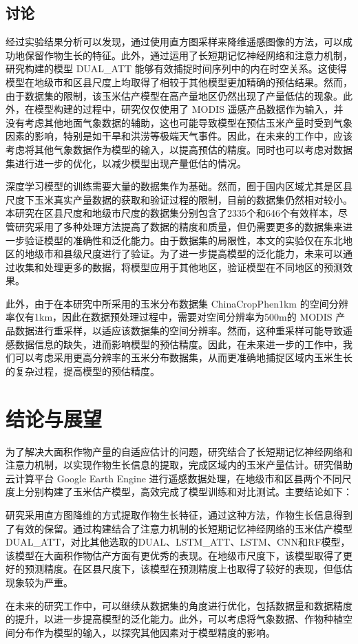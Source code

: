 \clearpage

\subsection{讨论}
\par 经过实验结果分析可以发现，通过使用直方图采样来降维遥感图像的方法，可以成功地保留作物生长的特征。此外，通过运用了长短期记忆神经网络和注意力机制，研究构建的模型 DUAL\_ATT 能够有效捕捉时间序列中的内在时空关系。这使得模型在地级市和区县尺度上均取得了相较于其他模型更加精确的预估结果。然而，由于数据集的限制，该玉米估产模型在高产量地区仍然出现了产量低估的现象。此外，在模型构建的过程中，研究仅仅使用了 MODIS 遥感产品数据作为输入，并没有考虑其他地面气象数据的辅助，这也可能导致模型在预估玉米产量时受到气象因素的影响，特别是如干旱和洪涝等极端天气事件。因此，在未来的工作中，应该考虑将其他气象数据作为模型的输入，以提高预估的精度。同时也可以考虑对数据集进行进一步的优化，以减少模型出现产量低估的情况。

\par 深度学习模型的训练需要大量的数据集作为基础。然而，囿于国内区域尤其是区县尺度下玉米真实产量数据的获取和验证过程的限制，目前的数据集仍然相对较小。本研究在区县尺度和地级市尺度的数据集分别包含了2335个和646个有效样本，尽管研究采用了多种处理方法提高了数据的精度和质量，但仍需要更多的数据集来进一步验证模型的准确性和泛化能力。由于数据集的局限性，本文的实验仅在东北地区的地级市和县级尺度进行了验证。为了进一步提高模型的泛化能力，未来可以通过收集和处理更多的数据，将模型应用于其他地区，验证模型在不同地区的预测效果。

\par 此外，由于在本研究中所采用的玉米分布数据集 ChinaCropPhen1km 的空间分辨率仅有1km，因此在数据预处理过程中，需要对空间分辨率为500m的 MODIS 产品数据进行重采样，以适应该数据集的空间分辨率。然而，这种重采样可能导致遥感数据信息的缺失，进而影响模型的预估精度。因此，在未来进一步的工作中，我们可以考虑采用更高分辨率的玉米分布数据集，从而更准确地捕捉区域内玉米生长的复杂过程，提高模型的预估精度。

\section{结论与展望}
\par 为了解决大面积作物产量的自适应估计的问题，研究结合了长短期记忆神经网络和注意力机制，以实现作物生长信息的提取，完成区域内的玉米产量估计。研究借助云计算平台 Google Earth Engine 进行遥感数据处理，在地级市和区县两个不同尺度上分别构建了玉米估产模型，高效完成了模型训练和对比测试。主要结论如下：

\par 研究采用直方图降维的方式提取作物生长特征，通过这种方法，作物生长信息得到了有效的保留。通过构建结合了注意力机制的长短期记忆神经网络的玉米估产模型DUAL\_ATT，对比其他选取的DUAL、LSTM\_ATT、LSTM、CNN和RF模型，该模型在大面积作物估产方面有更优秀的表现。在地级市尺度下，该模型取得了更好的预测精度。在区县尺度下，该模型在预测精度上也取得了较好的表现，但低估现象较为严重。

\par 在未来的研究工作中，可以继续从数据集的角度进行优化，包括数据量和数据精度的提升，以进一步提高模型的泛化能力。此外，可以考虑将气象数据、作物种植空间分布作为模型的输入，以探究其他因素对于模型精度的影响。